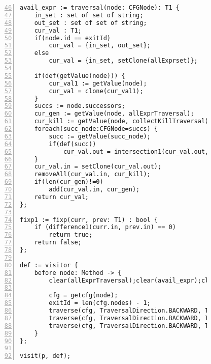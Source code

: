 \begin{figure}[ht!]
\begin{lstlisting}[numbers=left, tabsize=4, escapechar=@, caption={Very busy expression},label={lst:vbe-code},firstline=46, firstnumber=46,lastline=101]
avail_expr := traversal(node: CFGNode): T1 {
	in_set : set of set of string;
	out_set : set of set of string;
	cur_val : T1;
	if(node.id == exitId)
		cur_val = {in_set, out_set};
	else
		cur_val = {in_set, setClone(allExprset)};

	if(def(getValue(node))) {
		cur_val1 := getValue(node);
		cur_val = clone(cur_val1);
	}
	succs := node.successors;
	cur_gen := getValue(node, allExprTraversal);
	cur_kill := getValue(node, collectKillTraversal);
	foreach(succ_node:CFGNode=succs) {
		succ := getValue(succ_node);
		if(def(succ))
			cur_val.out = intersection1(cur_val.out, succ.in);
	}
	cur_val.in = setClone(cur_val.out);
	removeAll(cur_val.in, cur_kill);
	if(len(cur_gen)!=0)
		add(cur_val.in, cur_gen);
	return cur_val;
};

fixp1 := fixp(curr, prev: T1) : bool {
	if (difference1(curr.in, prev.in) == 0)
		return true;	
	return false;
};

def := visitor {
	before node: Method -> {
		clear(allExprTraversal);clear(avail_expr);clear(collectKillTraversal);clear(allExprset);

		cfg = getcfg(node);
		exitId = len(cfg.nodes) - 1;
		traverse(cfg, TraversalDirection.BACKWARD, TraversalKind.HYBRID, allExprTraversal);
		traverse(cfg, TraversalDirection.BACKWARD, TraversalKind.HYBRID, collectKillTraversal);
		traverse(cfg, TraversalDirection.BACKWARD, TraversalKind.HYBRID, avail_expr, fixp1);
	}
};

visit(p, def);
\end{lstlisting}
\end{figure}